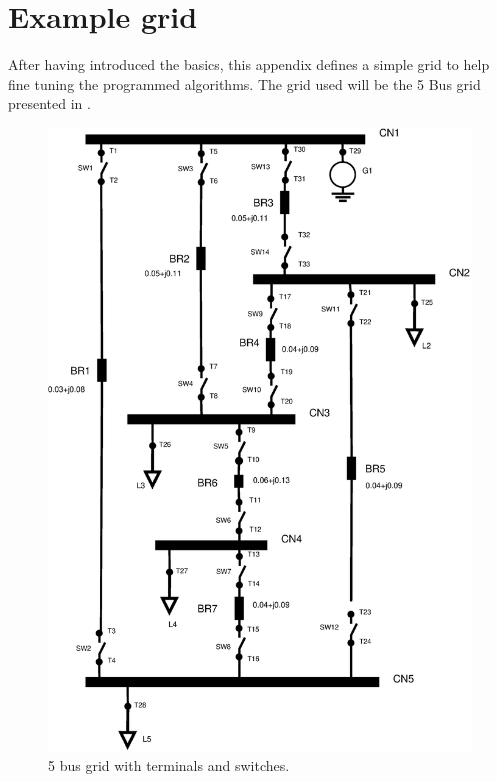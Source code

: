 \documentclass[nols,a4paper,twoside,symmetric,notoc,fleqn]{tufte-book}
\begin{document}




\appendix
\chapter{Example grid}

After having introduced the basics, this appendix defines a simple grid to help fine tuning the programmed algorithms. The grid used will be the 5 Bus grid presented in \cite{powell2004power}.

\begin{figure}[h!]
	\centering
	\includegraphics[width=0.7\linewidth]{img/Lynn5Bus.eps}
	\caption{5 bus grid with terminals and switches.}
	\label{fig:IEEE5}
\end{figure}
\end{document}
